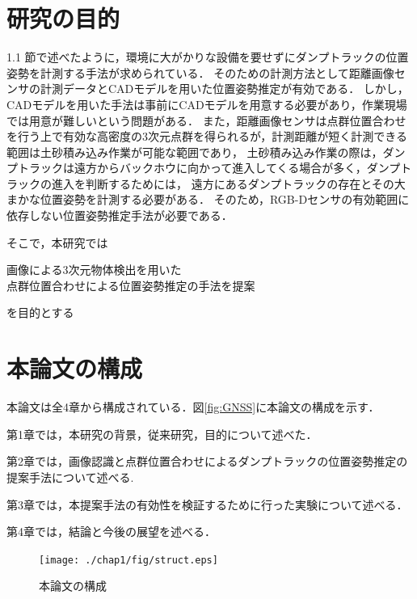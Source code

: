 \newpage
\section{研究の目的}
1.1 節で述べたように，環境に大がかりな設備を要せずにダンプトラックの位置姿勢を計測する手法が求められている．
そのための計測方法として距離画像センサの計測データとCADモデルを用いた位置姿勢推定が有効である．
しかし，CADモデルを用いた手法は事前にCADモデルを用意する必要があり，作業現場では用意が難しいという問題がある．
また，距離画像センサは点群位置合わせを行う上で有効な高密度の3次元点群を得られるが，計測距離が短く計測できる範囲は土砂積み込み作業が可能な範囲であり，
土砂積み込み作業の際は，ダンプトラックは遠方からバックホウに向かって進入してくる場合が多く，ダンプトラックの進入を判断するためには，
遠方にあるダンプトラックの存在とその大まかな位置姿勢を計測する必要がある．
そのため，RGB-Dセンサの有効範囲に依存しない位置姿勢推定手法が必要である．



\par
そこで，本研究では
    \begin{screen}
        \begin{center}
            画像による3次元物体検出を用いた\\点群位置合わせによる位置姿勢推定の手法を提案
        \end{center}
    \end{screen}
を目的とする
\newpage
\section{本論文の構成}
本論文は全4章から構成されている．図\ref{fig:GNSS}に本論文の構成を示す．\par
第1章では，本研究の背景，従来研究，目的について述べた．\par
第2章では，画像認識と点群位置合わせによるダンプトラックの位置姿勢推定の提案手法について述べる.\par
第3章では，本提案手法の有効性を検証するために行った実験について述べる．\par
第4章では，結論と今後の展望を述べる．
\begin{figure}[b]
    \begin{center}
    \texttt{[image: ./chap1/fig/struct.eps]}
    \caption{本論文の構成}
    \label{fig:flow}
    \end{center}
\end{figure}

